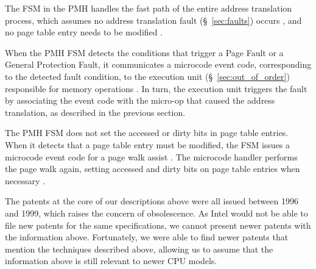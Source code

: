 
The FSM in the PMH handles the fast path of the entire address translation
process, which assumes no address translation fault (\S~\ref{sec:faults})
occurs
\cite{intel1996dtlb, intel1997pmh, intel1999exceptions, intel1999events}, and
no page table entry needs to be modified \cite{intel1997pmh}.

When the PMH FSM detects the conditions that trigger a Page Fault or a General
Protection Fault, it communicates a microcode event code, corresponding to the
detected fault condition, to the execution unit (\S~\ref{sec:out_of_order})
responsible for memory operations \cite{intel1996dtlb, intel1997pmh,
intel1999exceptions, intel1999events}. In turn, the execution unit triggers the
fault by associating the event code with the micro-op that caused the address
translation, as described in the previous section.

The PMH FSM does not set the accessed or dirty bits in page table entries. When
it detects that a page table entry must be modified, the FSM issues a microcode
event code for a page walk assist \cite{intel1997pmh}. The microcode handler
performs the page walk again, setting accessed and dirty bits on page table
entries when necessary \cite{intel1997pmh}.

The patents at the core of our descriptions above \cite{intel1996dtlb,
intel1997events, intel1997pmh, intel1999exceptions, intel1999events} were all
issued between 1996 and 1999, which raises the concern of obsolescence. As
Intel would not be able to file new patents for the same specifications, we
cannot present newer patents with the information above. Fortunately, we were
able to find newer patents that mention the techniques described above,
allowing us to assume that the information above is still relevant to newer
CPU models.

